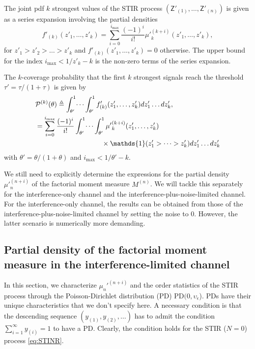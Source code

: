 \documentclass[lettersize,journal]{IEEEtran}
\begin{document}
The joint pdf $k$ strongest values of the STIR process $(\mathsf{Z}'_{(1)}, \dots, \mathsf{Z}'_{(n)})$ is given as a series expansion involving the partial densities
\begin{equation}
  \label{eq:jointprobability}
  f'_{(k)}(z'_1,\dots,z'_k)= \sum^{i_{\text{max}}}_{i=0}\frac{(-1)^i}{i!}{\mu'}_k^{(k+i)}(z'_1,\dots,z'_k),
\end{equation}
for $z'_1>z'_2>\dots>z'_k$ and $f'_{(k)}(z'_1,\dots,z'_k) =0 $ otherwise. The upper bound for the index $i_{\text{max}}<1/z'_k-k$ is the non-zero terms of the series expansion. 

The $k$-coverage probability that the first $k$ strongest signals reach the threshold $\tau' =\tau/(1+\tau)$ is given by
\begin{align}
  \label{eq:kprobability}
  &\mathcal{P}^{(k)}(\theta) \triangleq  \int_{\theta'}^1\dots \int_{\theta'}^1 f'_{(k)}({z'_1},\dots,{z'_k})dz'_1 \dots d{z'_k}, \nonumber\\
  &=\sum_{i=0}^{i_{\text{max}}}\frac{(-1)^i}{i!}\int_{\theta'}^1\dots \int_{\theta'}^1 {\mu'}_k^{(k+i)}(z'_1,\dots,z'_k) \nonumber\\
  &\hspace{3.4cm}\times\mathds{1}(z'_1>\dots>z'_k) dz'_1 \dots d{z'_k}
\end{align}
with $\theta'=\theta/(1+\theta)$ and $i_{\text{max}}<1/\theta'-k$.


We still need to explicitly determine the expressions for the partial density ${\mu'}_n^{(n+i)}$ of the factorial moment measure $M^{(n)}$. We will tackle this separately for the interference-only channel and the interference-plus-noise-limited channel. For the interference-only channel, the results can be obtained from those of the interference-plus-noise-limited channel by setting the noise to $0$. However, the latter scenario is numerically more demanding.


\subsection{Partial density of the factorial moment measure in the interference-limited channel}
In this section, we characterize $\mu_n'^{(n+i)}$ and the order statistics of the STIR process through the Poisson-Dirichlet distribution (PD)  $\text{PD}(0,\upsilon_{\epsilon}$). PDs have their unique characteristics that we don't specify here. A necessary condition is that the descending sequence  $(y_{(1)},y_{(2)},\dots)$ has to admit the condition $\sum_{i=1}^{\infty}y_{(i)}=1$ to have a PD. Clearly, the condition holds for the STIR ($N=0$) process \eqref{eq:STINR}.
\end{document}

